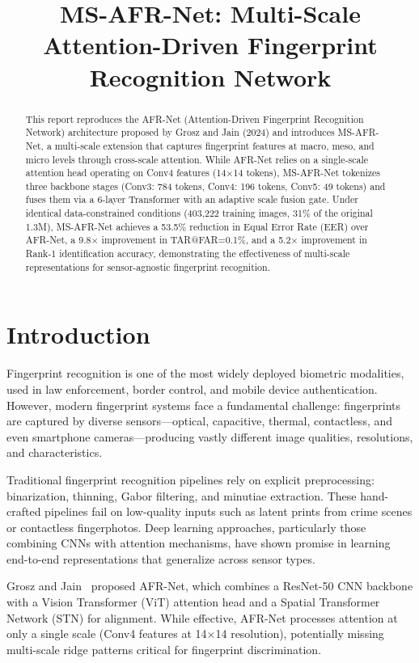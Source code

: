 \documentclass[conference]{IEEEtran}
\title{MS-AFR-Net: Multi-Scale Attention-Driven Fingerprint Recognition Network}
\author{
\IEEEauthorblockN{Kush Patel, Talak Shrabari}
\IEEEauthorblockA{
Department of Computer Science \\
University Name \\
Email: kushp3690@example.com, talakshrabari@example.com}
}
\begin{document}
\maketitle

\begin{abstract}
This report reproduces the AFR-Net (Attention-Driven Fingerprint Recognition Network) architecture proposed by Grosz and Jain (2024) and introduces MS-AFR-Net, a multi-scale extension that captures fingerprint features at macro, meso, and micro levels through cross-scale attention. While AFR-Net relies on a single-scale attention head operating on Conv4 features (14$\times$14 tokens), MS-AFR-Net tokenizes three backbone stages (Conv3: 784 tokens, Conv4: 196 tokens, Conv5: 49 tokens) and fuses them via a 6-layer Transformer with an adaptive scale fusion gate. Under identical data-constrained conditions (403,222 training images, 31\% of the original 1.3M), MS-AFR-Net achieves a 53.5\% reduction in Equal Error Rate (EER) over AFR-Net, a 9.8$\times$ improvement in TAR@FAR=0.1\%, and a 5.2$\times$ improvement in Rank-1 identification accuracy, demonstrating the effectiveness of multi-scale representations for sensor-agnostic fingerprint recognition.
\end{abstract}

\section{Introduction}

Fingerprint recognition is one of the most widely deployed biometric modalities, used in law enforcement, border control, and mobile device authentication. However, modern fingerprint systems face a fundamental challenge: fingerprints are captured by diverse sensors---optical, capacitive, thermal, contactless, and even smartphone cameras---producing vastly different image qualities, resolutions, and characteristics.

Traditional fingerprint recognition pipelines rely on explicit preprocessing: binarization, thinning, Gabor filtering, and minutiae extraction. These hand-crafted pipelines fail on low-quality inputs such as latent prints from crime scenes or contactless fingerphotos. Deep learning approaches, particularly those combining CNNs with attention mechanisms, have shown promise in learning end-to-end representations that generalize across sensor types.

Grosz and Jain~\cite{afrnet} proposed AFR-Net, which combines a ResNet-50 CNN backbone with a Vision Transformer (ViT) attention head and a Spatial Transformer Network (STN) for alignment. While effective, AFR-Net processes attention at only a single scale (Conv4 features at 14$\times$14 resolution), potentially missing multi-scale ridge patterns critical for fingerprint discrimination.
\end{document}
